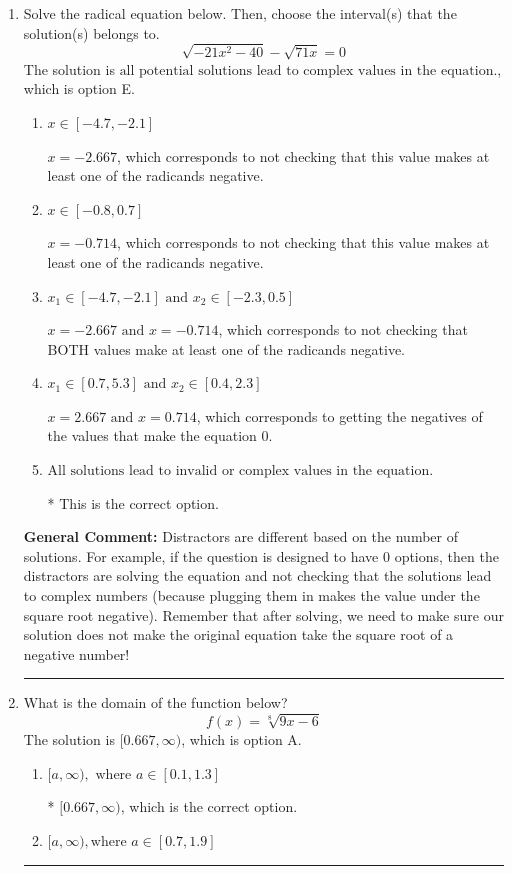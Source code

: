\documentclass{extbook}[14pt]
\newcommand{\litem}[1]{\item #1

\rule{\textwidth}{0.4pt}}
\begin{document}
\begin{enumerate}\litem{
Solve the radical equation below. Then, choose the interval(s) that the solution(s) belongs to.
\[ \sqrt{-21 x^2 - 40} - \sqrt{71 x} = 0 \]The solution is \( \text{all potential solutions lead to complex values in the equation.} \), which is option E.\begin{enumerate}[label=\Alph*.]
\item \( x \in [-4.7,-2.1] \)

$x = -2.667$, which corresponds to not checking that this value makes at least one of the radicands negative.
\item \( x \in [-0.8,0.7] \)

$x = -0.714$, which corresponds to not checking that this value makes at least one of the radicands negative.
\item \( x_1 \in [-4.7, -2.1] \text{ and } x_2 \in [-2.3,0.5] \)

$x = -2.667 \text{ and } x = -0.714$, which corresponds to not checking that BOTH values make at least one of the radicands negative.
\item \( x_1 \in [0.7, 5.3] \text{ and } x_2 \in [0.4,2.3] \)

$x = 2.667 \text{ and } x = 0.714$, which corresponds to getting the negatives of the values that make the equation 0.
\item \( \text{All solutions lead to invalid or complex values in the equation.} \)

* This is the correct option.
\end{enumerate}

\textbf{General Comment:} Distractors are different based on the number of solutions. For example, if the question is designed to have 0 options, then the distractors are solving the equation and not checking that the solutions lead to complex numbers (because plugging them in makes the value under the square root negative). Remember that after solving, we need to make sure our solution does not make the original equation take the square root of a negative number!
}
\litem{
What is the domain of the function below?
\[ f(x) = \sqrt[8]{9 x - 6} \]The solution is \( [0.667, \infty) \), which is option A.\begin{enumerate}[label=\Alph*.]
\item \( [a, \infty), \text{ where } a \in [0.1, 1.3] \)

* $[0.667, \infty)$, which is the correct option.
\item \( [a, \infty), \text{where } a \in [0.7, 1.9] \)


\end{enumerate}}
\end{enumerate}
\end{document}
